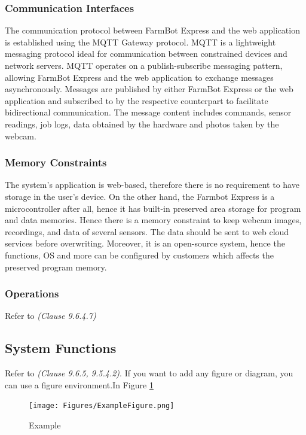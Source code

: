 \subsubsection{Communication Interfaces}

The communication protocol between FarmBot Express and the web application is established using the MQTT Gateway protocol. MQTT is a lightweight messaging protocol ideal for communication between constrained devices and network servers. MQTT operates on a publish-subscribe messaging pattern, allowing FarmBot Express and the web application to exchange messages asynchronously. Messages are published by either FarmBot Express or the web application and subscribed to by the respective counterpart to facilitate bidirectional communication. The message content includes commands, sensor readings, job logs, data obtained by the hardware and photos taken by the webcam.

\subsubsection{Memory Constraints}

The system's application is web-based, therefore there is no requirement to have storage in the user's device. On the other hand, the Farmbot Express is a microcontroller after all, hence it has built-in preserved area storage for program and data memories. Hence there is a memory constraint to keep webcam images, recordings, and data of several sensors. The data should be sent to web cloud services before overwriting. Moreover, it is an open-source system, hence the functions, OS and more can be configured by customers which affects the preserved program memory. 

\subsubsection{Operations}
Refer to \textit{(Clause 9.6.4.7)}

\subsection{System Functions}

Refer to \textit{(Clause 9.6.5, 9.5.4.2)}. If you want to add any figure or diagram, you can use a figure environment.In Figure \ref{Fig:Example}

\begin{figure}[ht]
\centering
\texttt{[image: Figures/ExampleFigure.png]}
\caption{Example \label{Fig:Example}}
\end{figure}


